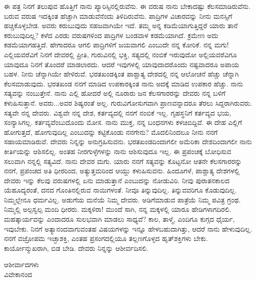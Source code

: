 ಈ ಪತ್ರ ನಿನಗೆ ತಲುಪುವ ಹೊತ್ತಿಗೆ ನಾನು ಪ್ಯಾರಿಸ್ಸಿನಲ್ಲಿರುವೆನು. ಈ ವರುಷ ನಾನು ಬೇಕಾದಷ್ಟು ಕೆಲಸಮಾಡಿರುವೆನು. ಬರುವ ವರುಷ ಇದಕ್ಕಿಂತ ಹೆಚ್ಚಾಗಿ ಮಾಡುವೆನೆಂದು ತಿಳಿದಿರುವೆನು. ಪಾದ್ರಿಗಳ ವಿಚಾರವನ್ನು ನೀನು ಮನಸ್ಸಿಗೆ ಹಚ್ಚಿಕೊಳ್ಳಬೇಡ. ಅವರು ಕರುಬುವುದು ಸಹಜವಾಗಿಯೇ ಇದೆ. ತಮ್ಮ ಅನ್ನ ಕಡಿಮೆಯಾಗುತ್ತಿದ್ದರೆ ಯಾರು ತಾನೆ ಕರುಬುವುದಿಲ್ಲ? ಕಳೆದ ಎರಡು ವರುಷಗಳಿಂದ ಪಾದ್ರಿಗಳ ಬಂಡವಾಳ ಕಡಮೆಯಾಗಿದೆ. ಕ್ರಮೇಣ ಅದು ಕಡಮೆಯಾಗಹತ್ತಿದೆ. ಹೇಗಾದರೂ ಆಗಲಿ ಪಾದ್ರಿಗಳಿಗೆ ಜಯವಾಗಲಿ ಎಂಬುದೇ ನನ್ನ ಕೋರಿಕೆ. ನನ್ನ ಮಗು! ಎಲ್ಲಿಯವರೆವಿಗೆ ನಿನಗೆ ದೇವರಲ್ಲಿ ಪ್ರೀತಿ, ಗುರುವಿನಲ್ಲಿ ಭಕ್ತಿ, ಸತ್ಯದಲ್ಲಿ ನಂಬಿಕೆ ಇರುವುದೋ ಅಲ್ಲಿಯವರೆವಿಗೂ ಯಾವುದೂ ನಿನಗೆ ತೊಂದರೆ ಮಾಡಲಾರದು. ಆದರೆ ಇವುಗಳಲ್ಲಿ ಯಾವುದಾದರೊಂದು ನಷ್ಟವಾದರೂ ಅಪಾಯ ಬಹಳ. ನೀನು ಚೆನ್ನಾಗಿಯೇ ಹೇಳಿರುವೆ. ಭರತಖಂಡಕ್ಕಿಂತ ಪಾಶ್ಚಾತ್ಯ ದೇಶದಲ್ಲಿ ನನ್ನ ಆಲೋಚನೆ ಹೆಚ್ಚು ಚೆನ್ನಾಗಿ ಕೆಲಸಮಾಡುವುದು. ಭರತಖಂಡ ನನಗೆ ಮಾಡಿದ ಉಪಕಾರಕ್ಕಿಂತ ನಾನು ಅದಕ್ಕೆ ಮಾಡಿದ ಉಪಕಾರ ಹೆಚ್ಚು. ನಾನು ಸತ್ಯವನ್ನು ನಂಬುತ್ತೇನೆ. ನಾನು ಎಲ್ಲಿ ಹೋದರೆ ಅಲ್ಲಿ ನೂರಾರು ಜನ ಕೆಲಸಗಾರರನ್ನು ದೇವರು ನನ್ನ ಬಳಿಗೆ ಕಳುಹಿಸುತ್ತಾನೆ. ಅವರು...ಅವರ ಶಿಷ್ಯರಂತೆ ಅಲ್ಲ. ಗುರುವಿಗೋಸುಗವಾಗಿ ಪ್ರಾಣವನ್ನಾದರೂ ತೆರಲು ಸಿದ್ದರಾಗಿರುವರು. ಸತ್ಯವೇ ನನ್ನ ದೇವರು. ವಿಶ್ವವೇ ನನ್ನ ದೇಶ, ಕರ್ತವ್ಯದಲ್ಲಿ ನನಗೆ ನಂಬಿಕೆ ಇಲ್ಲ. ಗೃಹಸ್ಥನಿಗೆ ಕರ್ತವ್ಯದ ಭಯ, ಸಂನ್ಯಾಸಿಗಲ್ಲ. ಕರ್ತವ್ಯವೆಂಬುದೊಂದು ಮೋಸ. ನಾನು ಮುಕ್ತ, ನನ್ನ ಬಂಧನಗಳು ಕಳಚಿಬಿದ್ದಿವೆ. ಈ ದೇಹ ಎಲ್ಲಿಗೆ ಹೋಗುತ್ತದೆ, ಹೋಗುವುದಿಲ್ಲ\enginline{-} ಎಂಬುದನ್ನು ಕಟ್ಟಿಕೊಂಡು ನನಗೇನು? ಮೊದಲಿನಿಂದಲೂ ನೀನು ನನಗೆ ಸಹಾಯಮಾಡಿರುವೆ. ದೇವರು ನಿನ್ನನ್ನು ಅನುಗ್ರಹಿಸುವನು. ಭರತಖಂಡದಿಂದಾಗಲೀ ಅಮೆರಿಕಾ ದೇಶದಿಂದಾಗಲೀ ನಾನು ಕೀರ್ತಿಯನ್ನು ಆಶಿಸಲಿಲ್ಲ. ಅಂತಹ ನೀರಗುಳ್ಳೆಗಳನ್ನು ನಾನು ಆಶಿಸುವುದೂ ಇಲ್ಲ. ಈ ಪ್ರಪಂಚಕ್ಕೆ ಬೋಧಿಸುವ ಸಲುವಾಗಿ ನನ್ನಲ್ಲಿ ಸತ್ಯವಿದೆ. ನಾನು ದೇವರ ಮಗು. ಯಾರು ನನಗೆ ಸತ್ಯವನ್ನು ಕೊಟ್ಟನೋ ಆತನೇ ಕೆಲಸಗಾರರನ್ನು ನನಗೆ, ಪ್ರಪಂಚದ ಅತಿ ಧೀರರಿಂದ, ಅತ್ಯುತ್ತಮರಿಂದ ಆಯ್ದು ಕಳುಹಿಸುವನು. ಹಿಂದೂಗಳೆ, ಪಾಶ್ಚಾತ್ಯ ದೇಶಗಳಲ್ಲಿ ದೇವರು ಇನ್ನು ಕೆಲವು ವರುಷಗಳಲ್ಲಿ ಏನು ಮಾಡುತ್ತಾನೆ ಎಂಬುದನ್ನು ನೋಡುವಿರಿ. ನೀವು ಪುರಾತನಕಾಲದ ಯೆಹೂದ್ಯರಂತೆ, ದನದ ಗೊಂತಿನಲ್ಲಿರುವ ನಾಯಿಗಳಂತೆ. ನೀವೂ ತಿನ್ನುವುದಿಲ್ಲ. ತಿನ್ನುವವರಿಗೂ ಕೊಡುವುದಿಲ್ಲ. ನಿಮ್ಮಲ್ಲೇನೂ ಧರ್ಮವಿಲ್ಲ. ಅಡುಗೆಯ ಮನೆಯೆ ನಿಮ್ಮ ದೇವರು. ಅಡಿಗೆಮಾಡುವ ಪಾತ್ರೆಯೆ ನಿಮ್ಮ ಪವಿತ್ರ ಗ್ರಂಥ. ನಿಮ್ಮಲ್ಲಿ ಅಲ್ಪಸ್ವಲ್ಪ ಮಂದಿ ಧೀರರು. ಮಕ್ಕಳಿರಾ! ಮುಂದೆ ಸಾಗಿ, ನನ್ನ ಮಕ್ಕಳಲ್ಲಿ ಯಾರೂ ಹೇಡಿಗಳಾಗದಿರಲಿ. ಮಹತ್ಕಾರ್ಯವನ್ನು ಎಂದಾದರೂ ಸುಲಭವಾಗಿ ಮಾಡಲು ಸಾಧ್ಯವೆ? ಕಾಲ, ತಾಳ್ಮೆ, ಎಂದಿಗೂ ಕುಗ್ಗದ ಧೈರ್ಯ, ಇವುಬೇಕು. ನಿನಗೆ ಅತ್ಯಾನಂದವಾಗುವಂತಹ ವಿಷಯಗಳನ್ನು ಇನ್ನೂ ಹೇಳಬಹುದಾಗಿತ್ತು, ಆದರೆ ನಾನು ಹೇಳುವುದಿಲ್ಲ. ನನಗೆ ವಜ್ರೋಪಮ ಇಚ್ಛಾಶಕ್ತಿ, ಎಂತಹ ಪ್ರಸಂಗದಲ್ಲಿಯೂ ತಲ್ಲಣಗೊಳ್ಳದ ಹೃತ್‌ಶಕ್ತಿಗಳು ಬೇಕು. ಕಾರ್ಯೋನ್ಮುಖರಾಗಿ, ಬಿಡ ಬೇಡಿ. ದೇವರು ನಿನ್ನನ್ನು ಆಶೀರ್ವದಿಸಲಿ.

\vspace{-0.4cm}

{\flushright
ಆಶೀರ್ವಾದಗಳು\\ವಿವೇಕಾನಂದ\par}

\vspace{-0.3cm}

